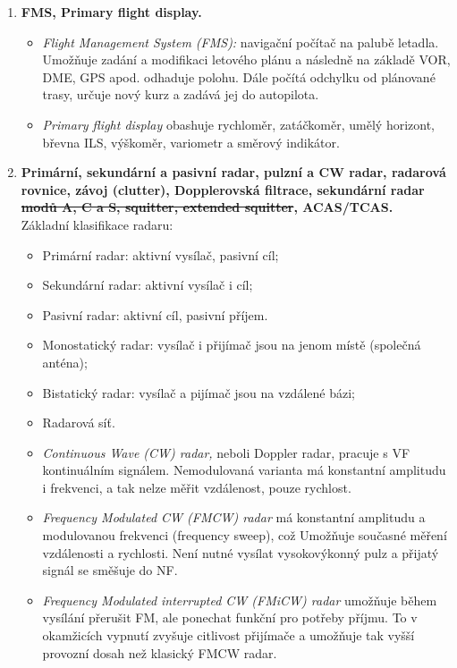 \documentclass[11pt,a4paper]{article}
\begin{document}
\begin{enumerate}
    \item \textbf{FMS, Primary flight display.}
    \begin{itemize}
        \item \emph{Flight Management System (FMS):} navigační počítač na palubě letadla. Umožňuje zadání a modifikaci letového plánu a následně na základě VOR, DME, GPS apod. odhaduje polohu. Dále počítá odchylku od plánované trasy, určuje nový kurz a zadává jej do autopilota.
        \item \emph{Primary flight display} obashuje rychloměr, zatáčkoměr, umělý horizont, břevna ILS, výškoměr, variometr a směrový indikátor.
    \end{itemize}
    
    \item \textbf{Primární, sekundární a pasivní radar, pulzní a CW radar, radarová rovnice, závoj (clutter), Dopplerovská filtrace, sekundární radar \sout{modů A, C a S, squitter, extended squitter}, ACAS/TCAS.}\\
    Základní klasifikace radaru:
    \begin{itemize}
        \item Primární radar: aktivní vysílač, pasivní cíl;
        \item Sekundární radar: aktivní vysílač i cíl;
        \item Pasivní radar: aktivní cíl, pasivní příjem.
    \end{itemize}
    \begin{itemize}
        \item Monostatický radar: vysílač i přijímač jsou na jenom místě (společná anténa);
        \item Bistatický radar: vysílač a pijímač jsou na vzdálené bázi;
        \item Radarová síť.
    \end{itemize}
    \begin{itemize}
        \item \emph{Continuous Wave (CW) radar,} neboli Doppler radar, pracuje s VF kontinuálním signálem. Nemodulovaná varianta má konstantní amplitudu i frekvenci, a tak nelze měřit vzdálenost, pouze rychlost.
        \item \emph{Frequency Modulated CW (FMCW) radar} má konstantní amplitudu a modulovanou frekvenci (frequency sweep), což Umožňuje současné měření vzdálenosti a rychlosti. Není nutné vysílat vysokovýkonný pulz a přijatý signál se směšuje do NF.
        \item \emph{Frequency Modulated interrupted CW (FMiCW) radar} umožňuje během vysílání přerušit FM, ale ponechat funkční pro potřeby příjmu. To v okamžicích vypnutí zvyšuje citlivost přijímače a umožňuje tak vyšší provozní dosah než klasický FMCW radar.

\end{itemize}
\end{enumerate}
\end{document}
